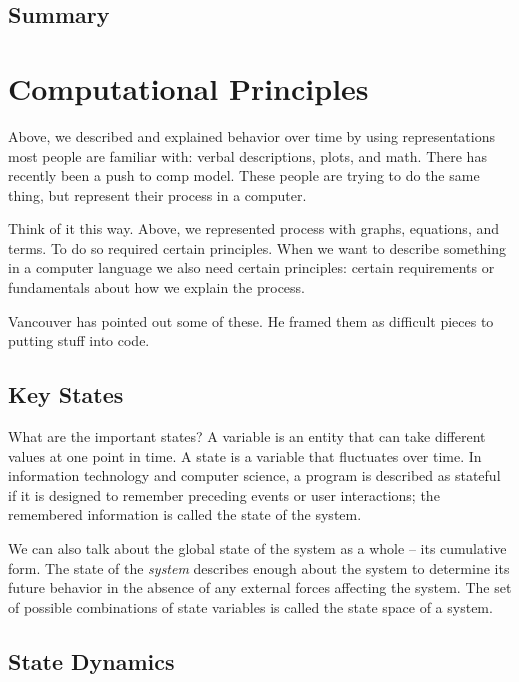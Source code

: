 \documentclass[english,,man]{apa6}
\theoremstyle{definition}
\theoremstyle{definition}
\theoremstyle{definition}
\theoremstyle{remark}
\begin{document}
\hypertarget{summary-1}{%
\subsection{Summary}\label{summary-1}}

\hypertarget{computational-principles}{%
\section{Computational Principles}\label{computational-principles}}

Above, we described and explained behavior over time by using
representations most people are familiar with: verbal descriptions,
plots, and math. There has recently been a push to comp model. These
people are trying to do the same thing, but represent their process in a
computer.

Think of it this way. Above, we represented process with graphs,
equations, and terms. To do so required certain principles. When we want
to describe something in a computer language we also need certain
principles: certain requirements or fundamentals about how we explain
the process.

Vancouver has pointed out some of these. He framed them as difficult
pieces to putting stuff into code.

\hypertarget{key-states}{%
\subsection{Key States}\label{key-states}}

What are the important states? A variable is an entity that can take
different values at one point in time. A state is a variable that
fluctuates over time. In information technology and computer science, a
program is described as stateful if it is designed to remember preceding
events or user interactions; the remembered information is called the
state of the system.

We can also talk about the global state of the system as a whole -- its
cumulative form. The state of the \emph{system} describes enough about
the system to determine its future behavior in the absence of any
external forces affecting the system. The set of possible combinations
of state variables is called the state space of a system.

\hypertarget{state-dynamics}{%
\subsection{State Dynamics}\label{state-dynamics}}
\end{document}
